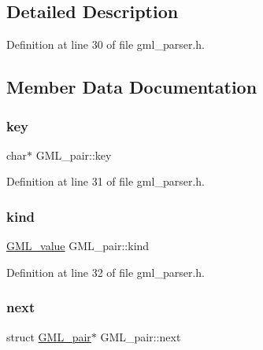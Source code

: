 \subsection{Detailed Description}


Definition at line 30 of file gml\+\_\+parser.\+h.



\subsection{Member Data Documentation}
\mbox{\label{struct_g_m_l__pair_a00e5de36c09fef63b8d439b4341f0655}} 
\subsubsection{\texorpdfstring{key}{key}}
{\footnotesize\ttfamily char$\ast$ G\+M\+L\+\_\+pair\+::key}



Definition at line 31 of file gml\+\_\+parser.\+h.

\mbox{\label{struct_g_m_l__pair_ab63f19fdd3fc40bfaba08d3af1a927d8}} 
\subsubsection{\texorpdfstring{kind}{kind}}
{\footnotesize\ttfamily \mbox{\hyperlink{gml__scanner_8h_a2dc4839311e05f9a17adefcd0012b77f}{G\+M\+L\+\_\+value}} G\+M\+L\+\_\+pair\+::kind}



Definition at line 32 of file gml\+\_\+parser.\+h.

\mbox{\label{struct_g_m_l__pair_aef47e6103f05e1411fa55f731972b592}} 
\subsubsection{\texorpdfstring{next}{next}}
{\footnotesize\ttfamily struct \mbox{\hyperlink{struct_g_m_l__pair}{G\+M\+L\+\_\+pair}}$\ast$ G\+M\+L\+\_\+pair\+::next}



